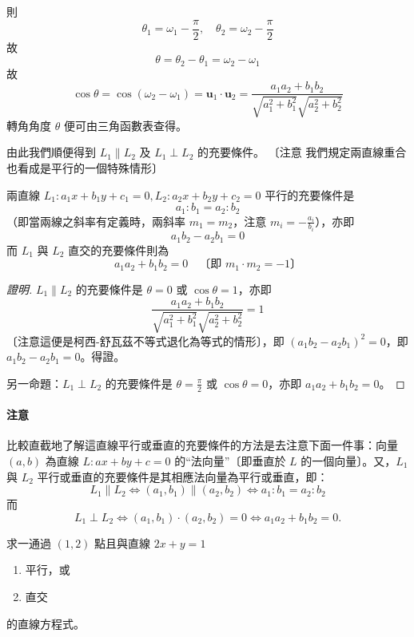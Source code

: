 則
\[ \theta_1 = \omega_1 - \frac{\pi}{2}, \quad \theta_2 = \omega_2 - \frac{\pi}{2} \]
故
\[ \theta = \theta_2 - \theta_1 = \omega_2 - \omega_1 \]
故
\[ \cos\theta = \cos(\omega_2 - \omega_1) = \mathbf{u}_1\cdot\mathbf{u}_2 = \frac{a_1 a_2 + b_1 b_2}{\sqrt{a_1^2 + b_1^2}\sqrt{a_2^2 + b_2^2}} \]
轉角角度 $\theta$ 便可由三角函數表查得。

由此我們順便得到 $L_1 \parallel L_2$ 及 $L_1 \perp L_2$ 的充要條件。
〔注意 我們規定兩直線重合也看成是平行的一個特殊情形〕

\begin{proposition}
\label{prop:b3-4-1}
兩直線 $L_1 : a_1 x + b_1 y + c_1 = 0, L_2 : a_2 x + b_2 y + c_2 = 0$ 平行的充要條件是
\begin{equation}
a_1 : b_1 = a_2 : b_2
\label{eq:b3-4-19}
\end{equation}
（即當兩線之斜率有定義時，兩斜率 $m_1 = m_2$，注意 $m_i = -\frac{a_i}{b_i}$），亦即
\[ a_1 b_2 - a_2 b_1 = 0 \]
而 $L_1$ 與 $L_2$ 直交的充要條件則為
\begin{equation}
a_1 a_2 + b_1 b_2 = 0 \quad\text{〔即 $m_1 \cdot m_2 = -1$〕}
\label{eq:b3-4-20}
\end{equation}
\end{proposition}

\begin{proof}[證明]
$L_1 \parallel L_2$ 的充要條件是 $\theta = 0$ 或 $\cos\theta = 1$，亦即
\[ \frac{a_1 a_2 + b_1 b_2}{\sqrt{a_1^2 + b_1^2}\sqrt{a_2^2 + b_2^2}} = 1 \]
〔注意這便是柯西-舒瓦茲不等式退化為等式的情形〕，即 $(a_1 b_2 - a_2 b_1)^2 = 0$，即 $a_1 b_2 - a_2 b_1 = 0$。得證。

另一命題：$L_1 \perp L_2$ 的充要條件是 $\theta = \frac{\pi}{2}$ 或 $\cos\theta = 0$，亦即 $a_1 a_2 + b_1 b_2 = 0$。
\end{proof}

\paragraph*{注意}
比較直截地了解這直線平行或垂直的充要條件的方法是去注意下面一件事：向量 $(a, b)$ 為直線 $L : ax + by + c = 0$ 的“法向量”〔即垂直於 $L$ 的一個向量〕。又，$L_1$ 與 $L_2$ 平行或垂直的充要條件是其相應法向量為平行或垂直，即：
\[ L_1 \parallel L_2 \iff (a_1, b_1) \parallel (a_2, b_2) \iff a_1 : b_1 = a_2 : b_2 \]
而
\[ L_1 \perp L_2 \iff (a_1, b_1)\cdot(a_2, b_2) = 0 \iff a_1 a_2 + b_1 b_2 = 0. \]

\begin{example}[例 15]
求一通過 $(1, 2)$ 點且與直線 $2x + y = 1$
\begin{enumerate}[label=(\roman*), leftmargin=2em]
  \item 平行，或
  \item 直交
\end{enumerate}
的直線方程式。
\end{example}

